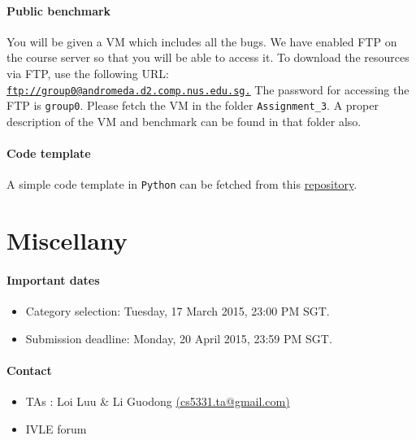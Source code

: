 \documentclass{article}[10pt]
\begin{document}
\paragraph{Public benchmark} You will be given a VM which includes all the bugs. We have enabled FTP on 
the course server so that you will be able to access it. To download 
the resources via FTP, use the following URL: 
\href{ftp://group0@andromeda.d2.comp.nus.edu.sg}{\tt ftp://group0@andromeda.d2.comp.nus.edu.sg.}
The password for accessing the FTP is \texttt{group0}. Please fetch the VM in the folder {\tt Assignment\_3}. A proper description of the VM and benchmark can be found in that folder also.

\paragraph{Code template} A simple code template in {\tt Python} can be fetched from this \href{https://github.com/will_udpate_later}{repository}.

\section{Miscellany}
\paragraph{Important dates}
\begin{itemize}
	\item Category selection:  Tuesday, 17 March 2015,  23:00 PM SGT.
	\item Submission deadline: Monday, 20 April 2015, 23:59 PM SGT.
\end{itemize}

\paragraph{Contact}
\begin{itemize}
\item TAs : Loi Luu \& Li Guodong \href{mailto:cs5331.ta@gmail.com}{(cs5331.ta@gmail.com)}
\item IVLE forum
\end{itemize}
\end{document}
